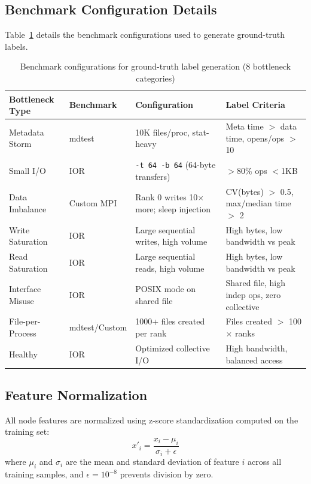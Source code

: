 \subsection{Benchmark Configuration Details}

Table~\ref{tab:benchmark-configs} details the benchmark configurations used to generate ground-truth labels.

\begin{table}[ht]
\caption{Benchmark configurations for ground-truth label generation (8 bottleneck categories)}
\label{tab:benchmark-configs}
\small
\begin{tabular}{@{}llll@{}}
\toprule
Bottleneck Type & Benchmark & Configuration & Label Criteria \\
\midrule
Metadata Storm & mdtest & 10K files/proc, stat-heavy & Meta time $>$ data time, opens/ops $>$10 \\
Small I/O & IOR & \texttt{-t 64 -b 64} (64-byte transfers) & $>$80\% ops $<$1KB \\
Data Imbalance & Custom MPI & Rank 0 writes 10$\times$ more; sleep injection & CV(bytes) $>$ 0.5, max/median time $>$ 2 \\
Write Saturation & IOR & Large sequential writes, high volume & High bytes, low bandwidth vs peak \\
Read Saturation & IOR & Large sequential reads, high volume & High bytes, low bandwidth vs peak \\
Interface Misuse & IOR & POSIX mode on shared file & Shared file, high indep ops, zero collective \\
File-per-Process & mdtest/Custom & 1000+ files created per rank & Files created $>$ 100 $\times$ ranks \\
Healthy & IOR & Optimized collective I/O & High bandwidth, balanced access \\
\bottomrule
\end{tabular}
\end{table}

\subsection{Feature Normalization}

All node features are normalized using z-score standardization computed on the training set:
\begin{equation}
x'_i = \frac{x_i - \mu_i}{\sigma_i + \epsilon}
\end{equation}
where $\mu_i$ and $\sigma_i$ are the mean and standard deviation of feature $i$ across all training samples, and $\epsilon = 10^{-8}$ prevents division by zero.

